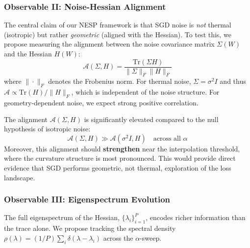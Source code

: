 \documentclass[
  journal=largetwo,
  year=2025,
  volume=37,
]{cup-journal}
\begin{document}
\subsubsection{Observable II: Noise-Hessian Alignment}

The central claim of our NESP framework is that SGD noise is \textit{not} thermal (isotropic) but rather \textit{geometric} (aligned with the Hessian). To test this, we propose measuring the alignment between the noise covariance matrix $\Sigma(W)$ and the Hessian $H(W)$:
\begin{equation}
    \mathcal{A}(\Sigma, H) = \frac{\mathrm{Tr}(\Sigma H)}{\|\Sigma\|_F \|H\|_F}
\end{equation}
where $\|\cdot\|_F$ denotes the Frobenius norm. For thermal noise, $\Sigma = \sigma^2 I$ and thus $\mathcal{A} \propto \mathrm{Tr}(H)/\|H\|_F$, which is independent of the noise structure. For geometry-dependent noise, we expect strong positive correlation.

\begin{hypothesis}
The alignment $\mathcal{A}(\Sigma, H)$ is significantly elevated compared to the null hypothesis of isotropic noise:
\begin{equation}
    \mathcal{A}(\Sigma, H) \gg \mathcal{A}(\sigma^2 I, H) \quad \text{across all } \alpha
\end{equation}
Moreover, this alignment should \textbf{strengthen} near the interpolation threshold, where the curvature structure is most pronounced. This would provide direct evidence that SGD performs geometric, not thermal, exploration of the loss landscape.
\end{hypothesis}

\subsubsection{Observable III: Eigenspectrum Evolution}

The full eigenspectrum of the Hessian, $\{\lambda_i\}_{i=1}^P$, encodes richer information than the trace alone. We propose tracking the spectral density $\rho(\lambda) = (1/P)\sum_i \delta(\lambda - \lambda_i)$ across the $\alpha$-sweep.
\end{document}
